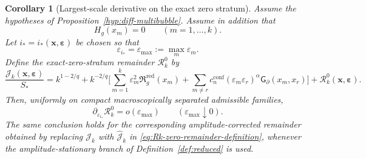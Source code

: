 \documentclass[11pt,reqno,a4paper]{amsart}
\numberwithin{equation}{section}
\theoremstyle{plain}
\newtheorem{corollary}[theorem]{Corollary}
\theoremstyle{remark}
\theoremstyle{plain}
\begin{document}
\begin{corollary}[Largest-scale derivative on the exact zero stratum]
\label{cor:max-scale-zero-derivative}
Assume the hypotheses of Proposition~\ref{hyp:diff-multibubble}.  Assume in addition that
\[
H_g(x_m)=0\qquad(m=1,\dots,k).
\]
Let
$i_\ast=i_\ast(\mathbf x,\boldsymbol\varepsilon)$ be chosen so that
\[
\varepsilon_{i_\ast}=\varepsilon_{\max}:=\max_m\varepsilon_m.
\]
Define the exact-zero-stratum remainder $\mathcal R_k^0$ by
\begin{equation}\label{eq:Rk-zero-remainder-definition}
\frac{\mathcal J_k(\mathbf x,\boldsymbol\varepsilon)}{S_\ast}
=k^{1-2/q}
+k^{-2/q}\Bigg[
\sum_{m=1}^k\varepsilon_m^2\mathfrak R_g^{\mathrm{red}}(x_m)
+
\sum_{m\ne r}c_n^{\mathrm{conf}}(\varepsilon_m\varepsilon_r)^\alpha
\mathsf G_\partial(x_m,x_r)
\Bigg]
+\mathcal R_k^0(\mathbf x,\boldsymbol\varepsilon).
\end{equation}
Then, uniformly on compact macroscopically separated admissible families,
\begin{equation}\label{eq:max-scale-zero-derivative}
\partial_{\varepsilon_{i_\ast}}\mathcal R_k^0
=o(\varepsilon_{\max})
\qquad(\varepsilon_{\max}\downarrow0).
\end{equation}
The same conclusion holds for the corresponding amplitude-corrected remainder obtained by replacing
$\mathcal J_k$ with $\hat{\mathcal J}_k$ in \eqref{eq:Rk-zero-remainder-definition}, whenever the
amplitude-stationary branch of Definition~\ref{def:reduced} is used.
\end{corollary}
\end{document}
